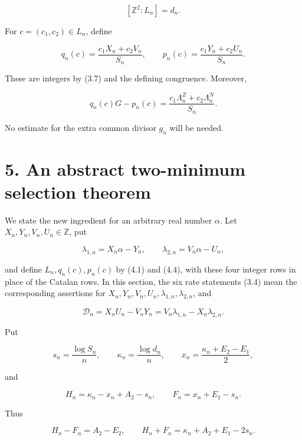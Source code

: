 \documentclass[
  11pt,
]{article}
\begin{document}
\[
 [\mathbb Z^2:L_n]=d_n.                             \tag{4.3}
\]

For \(c=(c_1,c_2)\in L_n\), define

\[
 q_n(c)=\frac{c_1X_n+c_2V_n}{S_n},\qquad
 p_n(c)=\frac{c_1Y_n+c_2U_n}{S_n}.                  \tag{4.4}
\]

These are integers by (3.7) and the defining congruence. Moreover,

\[
 q_n(c)G-p_n(c)
 =\frac{c_1\Lambda_n^Z+c_2\Lambda_n^N}{S_n}.        \tag{4.5}
\]

No estimate for the extra common divisor \(g_n\) will be needed.

\hypertarget{an-abstract-two-minimum-selection-theorem}{%
\section{5. An abstract two-minimum selection
theorem}\label{an-abstract-two-minimum-selection-theorem}}

We state the new ingredient for an arbitrary real number \(\alpha\). Let
\(X_n,Y_n,V_n,U_n\in\mathbb Z\), put

\[
 \lambda_{1,n}=X_n\alpha-Y_n,\qquad
 \lambda_{2,n}=V_n\alpha-U_n,
\]

and define \(L_n,q_n(c),p_n(c)\) by (4.1) and (4.4), with these four
integer rows in place of the Catalan rows. In this section, the six rate
statements (3.4) mean the corresponding assertions for
\(X_n,Y_n,V_n,U_n,\lambda_{1,n},\lambda_{2,n}\), and

\[
 \mathcal D_n=X_nU_n-V_nY_n
              =V_n\lambda_{1,n}-X_n\lambda_{2,n}.
\]

Put

\[
 s_n=\frac{\log S_n}{n},\qquad
 \kappa_n=\frac{\log d_n}{n},\qquad
 x_n=\frac{\kappa_n+E_2-E_1}{2},                    \tag{5.1}
\]

and

\[
 H_n=\kappa_n-x_n+A_2-s_n,\qquad
 F_n=x_n+E_1-s_n.                                   \tag{5.2}
\]

Thus

\[
 H_n-F_n=A_2-E_2,\qquad
 H_n+F_n=\kappa_n+A_2+E_1-2s_n.                    \tag{5.3}
\]
\end{document}
